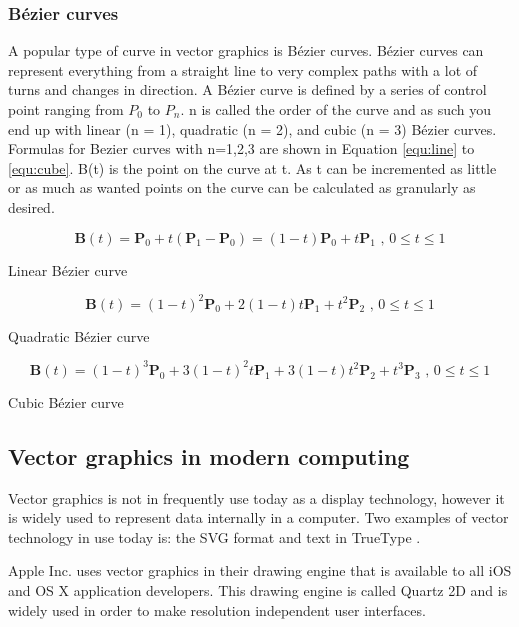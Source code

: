 \subsubsection{Bézier curves}
\label{sec:bezier}
A popular type of curve in vector graphics is Bézier curves.
Bézier curves can represent everything from a straight line to very complex paths with a lot of turns and changes in direction.
A Bézier curve is defined by a series of control point ranging from \(P_0\) to \(P_n\).
n is called the order of the curve and as such you end up with linear (n = 1), quadratic (n = 2), and cubic (n = 3) Bézier curves.
Formulas for Bezier curves with n=1,2,3 are shown in Equation \ref{equ:line} to \ref{equ:cube}.
B(t) is the point on the curve at t.
As t can be incremented as little or as much as wanted points on the curve can be calculated as granularly as desired.

\begin{cequation}[H]
	\begin{equation}
	    \label{equ:line}
		\mathbf{B}(t)=\mathbf{P}_0 + t(\mathbf{P}_1-\mathbf{P}_0)=(1-t)\mathbf{P}_0 + t\mathbf{P}_1 \mbox{ , } 0 \le t \le 1
	\end{equation}
	\caption{Linear Bézier curve}
\end{cequation}

\begin{cequation}[H]
	\begin{equation}
		\mathbf{B}(t) = (1 - t)^{2}\mathbf{P}_0 + 2(1 - t)t\mathbf{P}_1 + t^{2}\mathbf{P}_2 \mbox{ , } 0 \le t \le 1
	\end{equation}
	\caption{Quadratic Bézier curve}
\end{cequation}

\begin{cequation}[H]
	\begin{equation}
	    \label{equ:cube}
		\mathbf{B}(t)=(1-t)^3\mathbf{P}_0+3(1-t)^2t\mathbf{P}_1+3(1-t)t^2\mathbf{P}_2+t^3\mathbf{P}_3 \mbox{ , } 0 \le t \le 1
	\end{equation}
	\caption{Cubic Bézier curve}
\end{cequation}

\subsection{Vector graphics in modern computing}

Vector graphics is not in frequently use today as a display technology, however it is widely used to represent data internally in a computer.
Two examples of vector technology in use today is: the SVG format and text in TrueType \cite{truetype}.

Apple Inc. \cite{apple} uses vector graphics in their drawing engine that is available to all iOS and OS X application developers.
This drawing engine is called Quartz 2D \cite{quartz2d} and is widely used in order to make resolution independent user interfaces.
